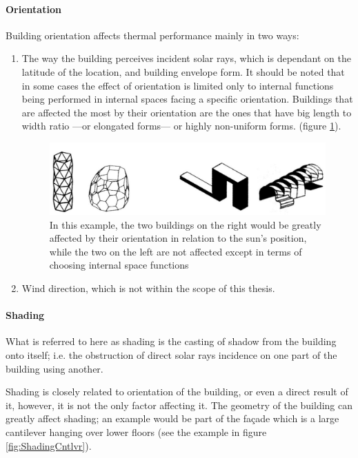 \paragraph{Orientation}\mbox{}

Building orientation affects thermal performance mainly in two ways:
\begin{enumerate}
	\item The way the building perceives incident solar rays, which is dependant on the latitude of the location, and building envelope form. It should be noted that in some cases the effect of orientation is limited only to internal functions being performed in internal spaces facing a specific orientation. Buildings that are affected the most by their orientation are the ones that have big length to width ratio ---or elongated forms--- or highly non-uniform forms. (figure \ref{fig:orientation}).
		\begin{figure}[H]
			\centering
			\includegraphics[width=13cm]{./Images/6-Orientation}
			\caption[Effect of Building Orientation]{In this example, the two buildings on the right would be greatly affected by their orientation in relation to the sun's position, while the two on the left are not affected except in terms of choosing internal space functions \cite{foa04}}
			\label{fig:orientation}
		\end{figure}
	\item Wind direction, which is not within the scope of this thesis.
\end{enumerate}

\paragraph{Shading}\mbox{}

What is referred to here as shading is the casting of shadow from the building onto itself; i.e. the obstruction of direct solar rays incidence on one part of the building using another.

Shading is closely related to orientation of the building, or even a direct result of it, however, it is not the only factor affecting it. The geometry of the building can greatly affect shading; an example would be part of the fa\c{c}ade which is a large cantilever hanging over lower floors (see the example in figure \ref{fig:ShadingCntlvr}).

